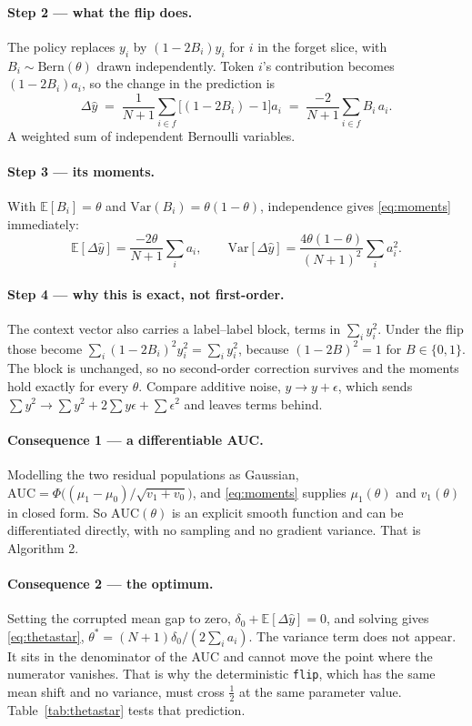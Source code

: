 \documentclass[11pt,a4paper]{article}
\begin{document}
\paragraph{Step 2 --- what the flip does.} The policy replaces $y_i$ by
$(1-2B_i)y_i$ for $i$ in the forget slice, with $B_i\sim\mathrm{Bern}(\theta)$
drawn independently. Token $i$'s contribution becomes $(1-2B_i)a_i$, so the
change in the prediction is
\[
\Delta\hat y \;=\; \frac{1}{N+1}\sum_{i\in f}\big[(1-2B_i)-1\big]a_i
\;=\; \frac{-2}{N+1}\sum_{i\in f} B_i\,a_i .
\]
A weighted sum of independent Bernoulli variables.

\paragraph{Step 3 --- its moments.} With $\mathbb E[B_i]=\theta$ and
$\mathrm{Var}(B_i)=\theta(1-\theta)$, independence gives
\eqref{eq:moments} immediately:
\[
\mathbb E[\Delta\hat y] = \frac{-2\theta}{N+1}\sum_i a_i,
\qquad
\mathrm{Var}[\Delta\hat y] = \frac{4\theta(1-\theta)}{(N+1)^2}\sum_i a_i^2 .
\]

\paragraph{Step 4 --- why this is exact, not first-order.} The context vector
also carries a label--label block, terms in $\sum_i y_i^2$. Under the flip
those become $\sum_i (1-2B_i)^2 y_i^2 = \sum_i y_i^2$, because $(1-2B)^2 = 1$
for $B\in\{0,1\}$. The block is unchanged, so no second-order correction
survives and the moments hold exactly for every $\theta$. Compare additive
noise, $y\to y+\epsilon$, which sends
$\sum y^2 \to \sum y^2 + 2\sum y\epsilon + \sum\epsilon^2$ and leaves terms
behind.

\paragraph{Consequence 1 --- a differentiable AUC.} Modelling the two residual
populations as Gaussian, $\mathrm{AUC} = \Phi\big((\mu_1-\mu_0)/\sqrt{v_1+v_0}\big)$,
and \eqref{eq:moments} supplies $\mu_1(\theta)$ and $v_1(\theta)$ in closed
form. So $\mathrm{AUC}(\theta)$ is an explicit smooth function and can be
differentiated directly, with no sampling and no gradient variance. That is
Algorithm 2.

\paragraph{Consequence 2 --- the optimum.} Setting the corrupted mean gap to
zero, $\delta_0 + \mathbb E[\Delta\hat y] = 0$, and solving gives
\eqref{eq:thetastar}, $\theta^* = (N+1)\delta_0 / (2\sum_i a_i)$. The variance
term does not appear. It sits in the denominator of the AUC and cannot move the
point where the numerator vanishes. That is why the deterministic \texttt{flip},
which has the same mean shift and no variance, must cross $\tfrac12$ at the
same parameter value. Table~\ref{tab:thetastar} tests that prediction.
\end{document}
